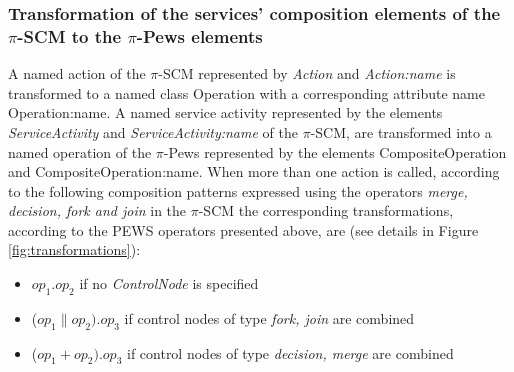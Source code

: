 
\subsubsection{Transformation of the services' composition elements of the $\pi$-SCM to the $\pi$-{\sc Pews} elements}
A named action of the $\pi$-SCM represented by  {\sc\em Action} and {\sc\em Action:name} is transformed to a  named class {\sc Operation} with a corresponding attribute name {\sc Operation:name}. A  named service activity represented by the elements {\sc\em ServiceActivity}  and  {\sc\em ServiceActivity:name} of the $\pi$-SCM, are  transformed into a named operation of the $\pi$-{\sc Pews} represented by the elements  {\sc CompositeOperation} and {\sc CompositeOperation:name}. When more than one action is called, according to the following  composition patterns expressed using the operators {\sc\em merge, decision, fork and join} in the $\pi$-SCM the corresponding transformations, according to the PEWS operators presented above, are (see details in Figure \ref{fig:transformations}):
\begin{itemize}
\item   $op_1 . op_2$ if no {\sc\em ControlNode} is specified
\item ($op_1 \parallel op_2) . op_3$ if control nodes of type {\sc\em fork, join} are combined
 \item ($op_1 + op_2) . op_3$ if control nodes of type {\sc\em decision, merge} are combined
\end{itemize}


